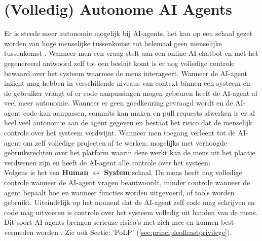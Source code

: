 \section{(Volledig) Autonome AI Agents}
\label{sec:volledigautonomeaiagents}
Er is steeds meer autonomie mogelijk bij AI-agents, het kan op een schaal gezet worden van hoge menselijke tussenkomst tot helemaal geen menselijke tussenkomst \autocite{mitchell2025}. Wanneer men een vraag stelt aan een online AI-chatbot en met het gegenereerd antwoord zelf tot een besluit komt is er nog volledige controle bewaard over het systeem waarmee de mens interageert. Wanneer de AI-agent inzicht mag hebben in verschillende niveaus van context binnen een systeem en de gebruiker vraagt of er code-aanpassingen mogen gebeuren heeft de AI-agent al veel meer autonomie. Wanneer er geen goedkeuring gevraagd wordt en de AI-agent code kan aanpassen, commits kan maken en pull requests afwerken is er al heel veel autonomie aan de agent gegeven en bestaat het risico dat de menselijk controle over het systeem verdwijnt. Wanneer men toegang verleent tot de AI-agent om zelf volledige projecten af te werken, mogelijks met verhoogde gebruiksrechten over het platform waarin deze werkt kan de mens uit het plaatje verdwenen zijn en heeft de AI-agent alle controle over het systeem. \\

Volgens \textcite{mitchell2025} is het een \textbf{Human} $\leftrightarrow$ \textbf{System} schaal. De mens heeft nog volledige controle wanneer de AI-agent vragen beantwoordt, minder controle wanneer de agent bepaalt hoe en wanneer functies worden uitgevoerd, of tools worden gebruikt. Uiteindelijk op het moment dat de AI-agent zelf code mag schrijven en code mag uitvoeren is controle over het systeem volledig uit handen van de mens. Dit soort AI-agents brengen serieuze risico's met zich mee en kunnen best vermeden worden \autocite{mitchell2025}. Zie ook Sectie: 'PoLP' (\ref{sec:principleofleastprivilege}). \\

